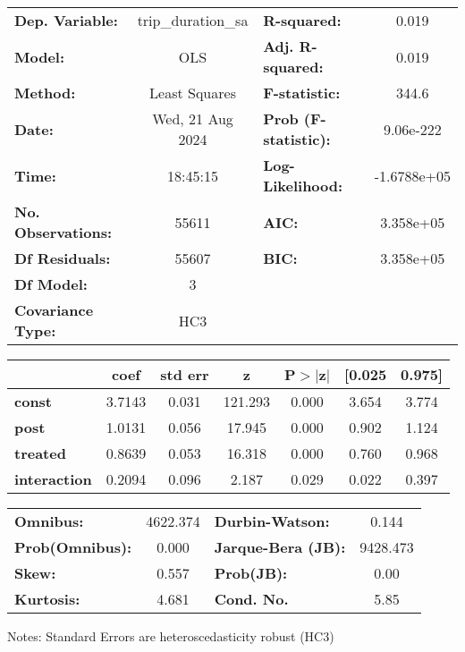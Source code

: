 \begin{center}
\begin{tabular}{lclc}
\toprule
\textbf{Dep. Variable:}    & trip\_duration\_sa & \textbf{  R-squared:         } &      0.019   \\
\textbf{Model:}            &        OLS         & \textbf{  Adj. R-squared:    } &      0.019   \\
\textbf{Method:}           &   Least Squares    & \textbf{  F-statistic:       } &      344.6   \\
\textbf{Date:}             &  Wed, 21 Aug 2024  & \textbf{  Prob (F-statistic):} &  9.06e-222   \\
\textbf{Time:}             &      18:45:15      & \textbf{  Log-Likelihood:    } & -1.6788e+05  \\
\textbf{No. Observations:} &        55611       & \textbf{  AIC:               } &  3.358e+05   \\
\textbf{Df Residuals:}     &        55607       & \textbf{  BIC:               } &  3.358e+05   \\
\textbf{Df Model:}         &            3       & \textbf{                     } &              \\
\textbf{Covariance Type:}  &        HC3         & \textbf{                     } &              \\
\bottomrule
\end{tabular}
\begin{tabular}{lcccccc}
                     & \textbf{coef} & \textbf{std err} & \textbf{z} & \textbf{P$> |$z$|$} & \textbf{[0.025} & \textbf{0.975]}  \\
\midrule
\textbf{const}       &       3.7143  &        0.031     &   121.293  &         0.000        &        3.654    &        3.774     \\
\textbf{post}        &       1.0131  &        0.056     &    17.945  &         0.000        &        0.902    &        1.124     \\
\textbf{treated}     &       0.8639  &        0.053     &    16.318  &         0.000        &        0.760    &        0.968     \\
\textbf{interaction} &       0.2094  &        0.096     &     2.187  &         0.029        &        0.022    &        0.397     \\
\bottomrule
\end{tabular}
\begin{tabular}{lclc}
\textbf{Omnibus:}       & 4622.374 & \textbf{  Durbin-Watson:     } &    0.144  \\
\textbf{Prob(Omnibus):} &   0.000  & \textbf{  Jarque-Bera (JB):  } & 9428.473  \\
\textbf{Skew:}          &   0.557  & \textbf{  Prob(JB):          } &     0.00  \\
\textbf{Kurtosis:}      &   4.681  & \textbf{  Cond. No.          } &     5.85  \\
\bottomrule
\end{tabular}
\end{center}

Notes: \newline
 [1] Standard Errors are heteroscedasticity robust (HC3)